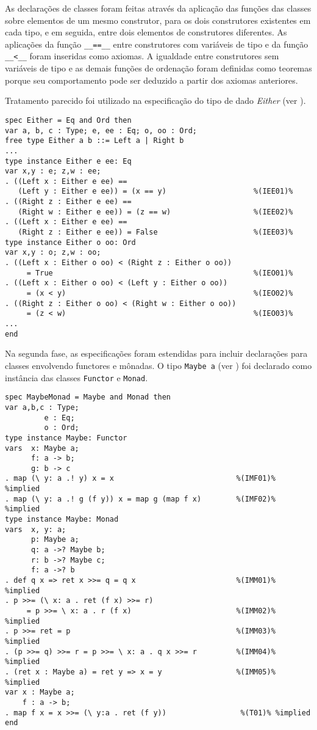 As declarações de classes foram feitas através da aplicação das funções das classes sobre elementos de um mesmo construtor, para os dois construtores existentes em cada tipo, e em seguida, entre dois elementos de construtores diferentes.
As aplicações  da função \Verb.__==__. entre construtores com variáveis de tipo e da função \Verb.__<__. foram inseridas como axiomas.
A igualdade entre construtores sem variáveis de tipo e as demais funções de ordenação foram definidas como teoremas porque seu comportamento pode ser deduzido a partir dos axiomas anteriores.

Tratamento parecido foi utilizado na especificação do tipo de dado \textit{Either} (ver ).

\begin{Verbatim}
spec Either = Eq and Ord then
var a, b, c : Type; e, ee : Eq; o, oo : Ord;
free type Either a b ::= Left a | Right b     
...
type instance Either e ee: Eq
var x,y : e; z,w : ee;
. ((Left x : Either e ee) == 
   (Left y : Either e ee)) = (x == y)                    %(IEE01)%
. ((Right z : Either e ee) ==
   (Right w : Either e ee)) = (z == w)                   %(IEE02)%
. ((Left x : Either e ee) ==
   (Right z : Either e ee)) = False                      %(IEE03)%
type instance Either o oo: Ord
var x,y : o; z,w : oo;
. ((Left x : Either o oo) < (Right z : Either o oo))
     = True                                              %(IEO01)%
. ((Left x : Either o oo) < (Left y : Either o oo))
     = (x < y)                                           %(IEO02)%
. ((Right z : Either o oo) < (Right w : Either o oo))
     = (z < w)                                           %(IEO03)%
...
end
\end{Verbatim}

Na segunda fase, as especificações foram estendidas para incluir declarações para classes envolvendo functores e mônadas.
O tipo \Verb.Maybe a. (ver ) foi declarado como instância das classes \Verb.Functor. e \Verb.Monad..

\begin{Verbatim}
spec MaybeMonad = Maybe and Monad then
var a,b,c : Type;
         e : Eq;
         o : Ord;
type instance Maybe: Functor
vars  x: Maybe a;
      f: a -> b;
      g: b -> c
. map (\ y: a .! y) x = x                            %(IMF01)% %implied
. map (\ y: a .! g (f y)) x = map g (map f x)        %(IMF02)% %implied
type instance Maybe: Monad
vars  x, y: a;
      p: Maybe a;
      q: a ->? Maybe b;
      r: b ->? Maybe c;
      f: a ->? b
. def q x => ret x >>= q = q x                       %(IMM01)% %implied
. p >>= (\ x: a . ret (f x) >>= r)
     = p >>= \ x: a . r (f x)                        %(IMM02)% %implied
. p >>= ret = p                                      %(IMM03)% %implied
. (p >>= q) >>= r = p >>= \ x: a . q x >>= r         %(IMM04)% %implied
. (ret x : Maybe a) = ret y => x = y                 %(IMM05)% %implied
var x : Maybe a;
    f : a -> b;
. map f x = x >>= (\ y:a . ret (f y))                 %(T01)% %implied
end
\end{Verbatim}


